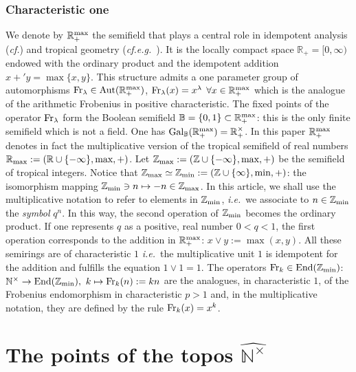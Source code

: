 \documentclass[noams,lp]{compositio}
\def\Aut{{\rm Aut}}
\def\End{{\rm End}}
\def\B{{\mathbb B}}
\def\N{{\mathbb N}}
\def\R{{\mathbb R}}
\def\Z{{\mathbb Z}}
\newcommand{\ie}{{\it i.e.\/}\ }
\newcommand{\eg}{{\it e.g.\/}\ }
\newcommand{\cf}{{\it cf.}}
\def\zmin{\Z_{\rm min}}
\def\End{{\mbox{End}}}
\def\ff{{\rm  Fr}}
\def\rmax{\R_+^{\rm max}}
\def\fr{{\rm Fr}}
\def\wnt{{\widehat{\N^{\times}}}}
\begin{document}
\subsubsection*{Characteristic one}
We denote by  $\rmax$ the semifield that plays a central role in idempotent analysis (\cf \cite{Maslov, Litvinov}) and tropical geometry (\cf \eg \cite{Gathmann, Mikhalkin}). It is the locally compact space $\R_+=[0,\infty)$ endowed with the ordinary product and the idempotent addition $x +' y=\max\{ x ,y \}$. This structure admits a one parameter group of automorphisms $\fr_\lambda\in \Aut(\rmax)$, $\fr_\lambda(x)=x^\lambda$ $\forall x\in\rmax$ which is the analogue of the arithmetic Frobenius in positive characteristic. The fixed points of the operator $\fr_\lambda$ form the Boolean semifield $\B=\{0,1\}\subset \rmax$: this is the only finite semifield which is not a field. One has 
${\rm Gal}_\B(\rmax)=\R^\times_+$.
In this paper  $\rmax$ denotes in fact the multiplicative version of the tropical semifield of real numbers $\R_{\rm max}:= (\R\cup\{-\infty\},\text{max},+)$.\newline
Let $\Z_{\rm max}:= (\Z\cup\{-\infty\},\text{max},+)$ be the  semifield of  tropical integers. Notice that $\Z_{\rm max}\simeq\zmin:= (\Z\cup\{\infty\},\text{min},+)$: the isomorphism mapping $\zmin\ni n\mapsto -n\in \Z_{\rm max}$.\newline
In this article, we shall use the multiplicative notation to refer to elements in $\zmin$, \ie we associate to $n\in\zmin$ the {\em symbol} $q^n$. In this way, the second operation of $\zmin$  becomes the ordinary product. If one represents $q$ as a positive, real number $0<q<1$, the first operation corresponds to the addition in $\rmax$: $x\vee y:=\max(x,y)$.\newline   
All these semirings are of characteristic $1$ \ie the multiplicative unit $1$ is idempotent for the addition and fulfills the equation $1\vee 1=1$. 
The operators $\ff_k\in \End(\zmin)$:  ~
$\N^\times \to \End(\zmin),~k\mapsto\ff_k(n) := kn$ 
are the analogues, in characteristic $1$, of the Frobenius endomorphism in characteristic $p>1$ and, in the multiplicative notation, they are defined by the rule $\ff_k(x)=x^k$. 



\section{The points of the topos $\wnt$}\label{sectlb}
\end{document}
